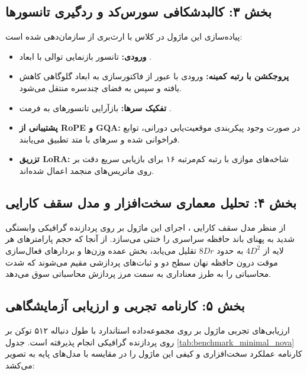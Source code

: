 \subsection*{بخش ۳: کالبدشکافی سورس‌کد و ردگیری تانسورها }
پیاده‌سازی این ماژول در کلاس  با ارث‌بری از  سازمان‌دهی شده است:
\begin{itemize}
    \item \textbf{ورودی:} تانسور بازنمایی توالی با ابعاد \lr{$[B, N, D]$}.
    \item \textbf{پروجکشن با رتبه کمینه:} ورودی با عبور از فاکتورسازی  به ابعاد گلوگاهی \lr{$[B, N, r]$} کاهش یافته و سپس به فضای چندسره \lr{$[B, N, H \cdot d\_h]$} منتقل می‌شود.
    \item \textbf{تفکیک سرها:} بازآرایی تانسورهای  به فرمت \lr{$[B, H, N, d\_h]$}.
    \item \textbf{پشتیبانی از RoPE و GQA:} در صورت وجود پیکربندی موقعیت‌یابی دورانی، توابع  فراخوانی شده و سرهای  با متد  تطبیق می‌یابند.
    \item \textbf{تزریق LoRA:} شاخه‌های موازی  با رتبه کم‌مرتبه ۱۶ برای بازیابی سریع دقت بر روی ماتریس‌های منجمد اعمال شده‌اند.
\end{itemize}

\subsection*{بخش ۴: تحلیل معماری سخت‌افزار و مدل سقف کارایی }
از منظر مدل سقف کارایی ، اجرای این ماژول بر روی پردازنده گرافیکی  وابستگی شدید به پهنای باند حافظه سراسری  را خنثی می‌سازد. از آنجا که حجم پارامترهای هر لایه از $4 D^2$ به حدود $8 D r$ تقلیل می‌یابد، بخش عمده وزن‌ها و بردارهای فعال‌سازی موقت درون حافظه نهان سطح دو  و ثبات‌های پردازشی  مقیم می‌شوند که شدت محاسباتی  را به طرز معناداری به سمت مرز پردازش محاسباتی سوق می‌دهد.

\subsection*{بخش ۵: کارنامه تجربی و ارزیابی آزمایشگاهی }
ارزیابی‌های تجربی ماژول  بر روی مجموعه‌داده استاندارد  با طول دنباله ۵۱۲ توکن بر روی پردازنده گرافیکی  انجام پذیرفته است. جدول \ref{tab:benchmark_minimal_nova} کارنامه عملکرد سخت‌افزاری و کیفی این ماژول را در مقایسه با مدل‌های پایه به تصویر می‌کشد:

